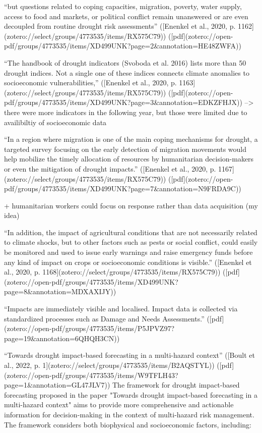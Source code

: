 {“but questions related to coping capacities, migration, poverty, water supply, access to food and markets, or political conflict remain unanswered or are even decoupled from routine drought risk assessments” ([Enenkel et al., 2020, p. 1162](zotero://select/groups/4773535/items/RX575C79)) ([pdf](zotero://open-pdf/groups/4773535/items/XD499UNK?page=2&annotation=HE48ZWFA))

“The handbook of drought indicators (Svoboda et al. 2016) lists more than 50 drought indices. Not a single one of these indices connects climate anomalies to socioeconomic vulnerabilities,” ([Enenkel et al., 2020, p. 1163](zotero://select/groups/4773535/items/RX575C79)) ([pdf](zotero://open-pdf/groups/4773535/items/XD499UNK?page=3&annotation=EDKZFHJX))
--> there were more indicators in the following year, but those were limited due to availibiltiy of socioeconomic data

“In a region where migration is one of the main coping mechanisms for drought, a targeted survey focusing on the early detection of migration movements would help mobilize the timely allocation of resources by humanitarian decision-makers or even the mitigation of drought impacts.” ([Enenkel et al., 2020, p. 1167](zotero://select/groups/4773535/items/RX575C79)) ([pdf](zotero://open-pdf/groups/4773535/items/XD499UNK?page=7&annotation=N9FRDA9C))

+ humanitarian workers could focus on response rather than data acquisition (my idea)

“In addition, the impact of agricultural conditions that are not necessarily related to climate shocks, but to other factors such as pests or social conflict, could easily be monitored and used to issue early warnings and raise emergency funds before any kind of impact on crops or socioeconomic conditions is visible.” ([Enenkel et al., 2020, p. 1168](zotero://select/groups/4773535/items/RX575C79)) ([pdf](zotero://open-pdf/groups/4773535/items/XD499UNK?page=8&annotation=MDXAXIJY))

“Impacts are immediately visible and localised. Impact data is collected via standardized processes such as Damage and Needs Assessments.” ([pdf](zotero://open-pdf/groups/4773535/items/P5JPVZ97?page=19&annotation=6QHQH3CN))



“Towards drought impact-based forecasting in a multi-hazard context” ([Boult et al., 2022, p. 1](zotero://select/groups/4773535/items/B2AQSTYL)) ([pdf](zotero://open-pdf/groups/4773535/items/W9TFLH43?page=1&annotation=GL47JLV7))
The framework for drought impact-based forecasting proposed in the paper "Towards drought impact-based forecasting in a multi-hazard context" aims to provide more comprehensive and actionable information for decision-making in the context of multi-hazard risk management. The framework considers both biophysical and socioeconomic factors, including:

}
